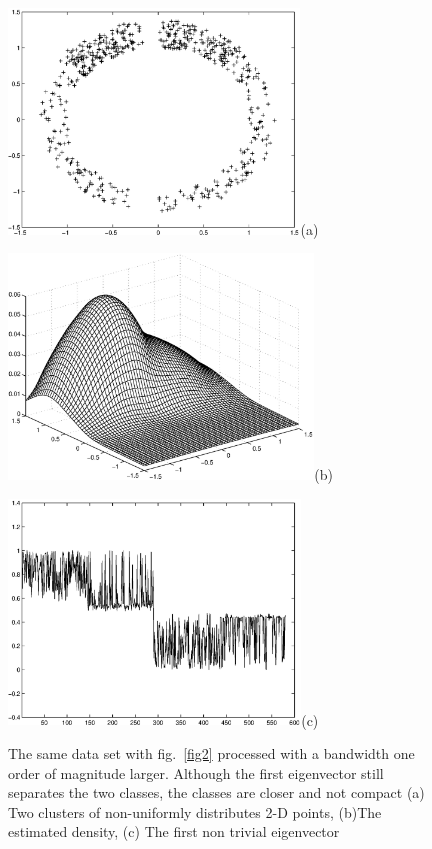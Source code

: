 \documentclass[12pt,letterpaper,doublespaced,ETD,dvips,proposal]{gtthesis}
\begin{document}
\begin{Body}
\begin{figure}[tb]
 \centerline{\includegraphics[height=6cm]{fig3a.eps}(a)}
 \centerline{\includegraphics[height=6cm]{fig3b.eps}(b)}
 \centerline{\includegraphics[height=6cm]{fig3c.eps}(c)}
\caption{The same data set with fig.~\ref{fig2} processed with a
bandwidth one order of magnitude larger. Although the first
eigenvector still separates the two classes, the classes are closer
and not compact (a) Two clusters of non-uniformly distributes 2-D
points, (b)The estimated density, (c) The first non trivial
eigenvector }
  \label{fig3}
\end{figure}



\end{Body}
\end{document}
